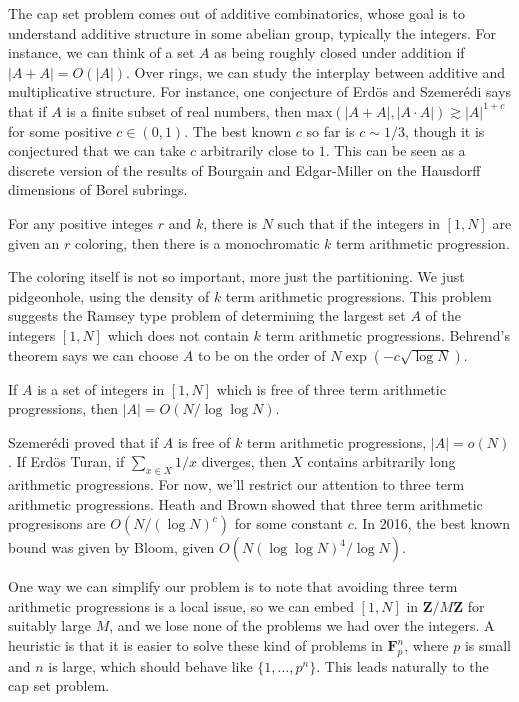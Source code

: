 The cap set problem comes out of additive combinatorics, whose goal is to understand additive structure in some abelian group, typically the integers. For instance, we can think of a set $A$  as being roughly closed under addition if $|A+A| = O(|A|)$. Over rings, we can study the interplay between additive and multiplicative structure. For instance, one conjecture of Erd\"{o}s and Szemer\'{e}di says that if $A$ is a finite subset of real numbers, then $\text{max}(|A+A|,|A \cdot A|) \gtrsim |A|^{1+c}$ for some positive $c \in (0,1)$. The best known $c$ so far is $c \sim 1/3$, though it is conjectured that we can take $c$ arbitrarily close to $1$. This can be seen as a discrete version of the results of Bourgain and Edgar-Miller on the Hausdorff dimensions of Borel subrings.

\begin{theorem}
	For any positive integes $r$ and $k$, there is $N$ such that if the integers in $[1,N]$ are given an $r$ coloring, then there is a monochromatic $k$ term arithmetic progression.
\end{theorem}

The coloring itself is not so important, more just the partitioning. We just pidgeonhole, using the density of $k$ term arithmetic progressions. This problem suggests the Ramsey type problem of determining the largest set $A$ of the integers $[1,N]$ which does not contain $k$ term arithmetic progressions. Behrend's theorem says we can choose $A$ to be on the order of $N\exp(-c \sqrt{\log N})$.

\begin{theorem}[Roth - 1956] If $A$ is a set of integers in $[1,N]$ which is free of three term arithmetic progressions, then $|A| = O(N/\log \log N)$.
\end{theorem}

Szemer\'{e}di proved that if $A$ is free of $k$ term arithmetic progressions, $|A| = o(N)$. If Erd\"{o}s Turan, if $\sum_{x \in X} 1/x$ diverges, then $X$ contains arbitrarily long arithmetic progressions. For now, we'll restrict our attention to three term arithmetic progressions. Heath and Brown showed that three term arithmetic progresisons are $O(N/(\log N)^c)$ for some constant $c$. In 2016, the best known bound was given by Bloom, given $O(N(\log \log N)^4/\log N)$.

One way we can simplify our problem is to note that avoiding three term arithmetic progressions is a local issue, so we can embed $[1,N]$ in $\mathbf{Z}/M\mathbf{Z}$ for suitably large $M$, and we lose none of the problems we had over the integers. A heuristic is that it is easier to solve these kind of problems in $\mathbf{F}_p^n$, where $p$ is small and $n$ is large, which should behave like $\{ 1, \dots, p^n \}$. This leads naturally to the cap set problem.

